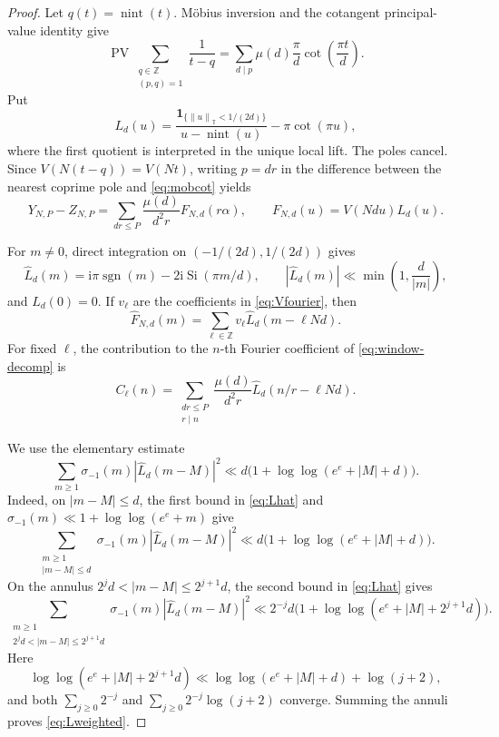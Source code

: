 \documentclass[11pt]{article}
\numberwithin{equation}{section}
\theoremstyle{definition}
\newcommand{\T}{\mathbb T}
\newcommand{\Z}{\mathbb Z}
\newcommand{\1}{\mathbf 1}
\newcommand{\ii}{\mathrm i}
\newcommand{\PV}{\operatorname{PV}}
\newcommand{\nint}{\operatorname{nint}}
\newcommand{\sgn}{\operatorname{sgn}}
\newcommand{\Si}{\operatorname{Si}}
\newcommand{\norm}[1]{\left\lVert#1\right\rVert}
\newcommand{\abs}[1]{\left\lvert#1\right\rvert}
\newcommand{\wh}{\widehat}
\begin{document}
\begin{proof}
Let \(q(t)=\nint(t)\).  Möbius inversion and the cotangent
principal-value identity give
\begin{equation}\label{eq:mobcot}
 \PV\sum_{\substack{q\in\Z\\(p,q)=1}}\frac1{t-q}
 =\sum_{d\mid p}\mu(d)\frac{\pi}{d}\cot\left(\frac{\pi t}{d}\right).
\end{equation}
Put
\[
 L_d(u)=
 \frac{\1_{\{\norm{u}_{\T}<1/(2d)\}}}{u-\nint(u)}
 -\pi\cot(\pi u),
\]
where the first quotient is interpreted in the unique local lift.  The
poles cancel.  Since \(V(N(t-q))=V(Nt)\), writing \(p=dr\) in the
difference between the nearest coprime pole and \eqref{eq:mobcot} yields
\begin{equation}\label{eq:window-decomp}
 Y_{N,P}-Z_{N,P}
 =\sum_{dr\le P}\frac{\mu(d)}{d^2r}F_{N,d}(r\alpha),
 \qquad
 F_{N,d}(u)=V(Ndu)L_d(u).
\end{equation}

For \(m\ne0\), direct integration on
\((-1/(2d),1/(2d))\) gives
\begin{equation}\label{eq:Lhat}
 \wh L_d(m)=
 \ii\pi\sgn(m)-2\ii\Si(\pi m/d),\qquad
 \abs{\wh L_d(m)}\ll\min\left(1,\frac d{|m|}\right),
\end{equation}
and \(\wh L_d(0)=0\).  If \(v_\ell\) are the coefficients in
\eqref{eq:Vfourier}, then
\[
 \wh F_{N,d}(m)=\sum_{\ell\in\Z}v_\ell
 \wh L_d(m-\ell Nd).
\]
For fixed \(\ell\), the contribution to the \(n\)-th Fourier coefficient
of \eqref{eq:window-decomp} is
\begin{equation}\label{eq:C-ell}
 C_\ell(n)=
 \sum_{\substack{dr\le P\\r\mid n}}
 \frac{\mu(d)}{d^2r}
 \wh L_d(n/r-\ell Nd).
\end{equation}

We use the elementary estimate
\begin{equation}\label{eq:Lweighted}
 \sum_{m\ge1}\sigma_{-1}(m)
 \abs{\wh L_d(m-M)}^2
 \ll
 d\bigl(1+\log\log(e^e+|M|+d)\bigr).
\end{equation}
Indeed, on \(|m-M|\le d\), the first bound in
\eqref{eq:Lhat} and
\(\sigma_{-1}(m)\ll1+\log\log(e^e+m)\) give
\[
 \sum_{\substack{m\ge1\\|m-M|\le d}}
 \sigma_{-1}(m)|\widehat L_d(m-M)|^2
 \ll d\bigl(1+\log\log(e^e+|M|+d)\bigr).
\]
On the annulus \(2^jd<|m-M|\le2^{j+1}d\), the second bound in
\eqref{eq:Lhat} gives
\[
 \sum_{\substack{m\ge1\\2^jd<|m-M|\le2^{j+1}d}}
 \sigma_{-1}(m)|\widehat L_d(m-M)|^2
 \ll 2^{-j}d
 \bigl(1+\log\log(e^e+|M|+2^{j+1}d)\bigr).
\]
Here
\[
 \log\log(e^e+|M|+2^{j+1}d)
 \ll \log\log(e^e+|M|+d)+\log(j+2),
\]
and both \(\sum_{j\ge0}2^{-j}\) and
\(\sum_{j\ge0}2^{-j}\log(j+2)\) converge.  Summing the annuli proves
\eqref{eq:Lweighted}.


\end{proof}
\end{document}
